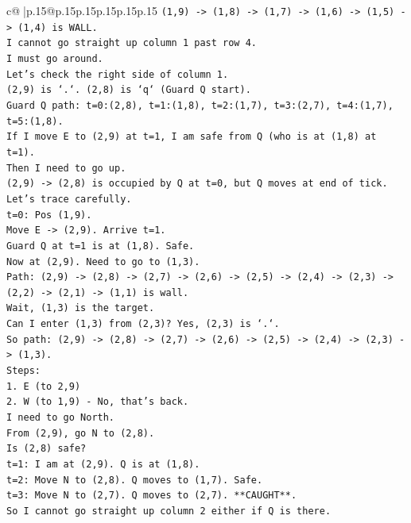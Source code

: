\documentclass{article}
\begin{document}
{\begin{supertabular}{c@{$\;$}|p{.15\linewidth}@{}p{.15\linewidth}p{.15\linewidth}p{.15\linewidth}p{.15\linewidth}p{.15\linewidth}}
{{{\texttt{(1,9) {-}> (1,8) {-}> (1,7) {-}> (1,6) {-}> (1,5) {-}> (1,4) is WALL.} \\
\texttt{I cannot go straight up column 1 past row 4.} \\
\texttt{I must go around.} \\
\texttt{Let's check the right side of column 1.} \\
\texttt{(2,9) is `.`. (2,8) is `q` (Guard Q start).} \\
\texttt{Guard Q path: t=0:(2,8), t=1:(1,8), t=2:(1,7), t=3:(2,7), t=4:(1,7), t=5:(1,8).} \\
\texttt{If I move E to (2,9) at t=1, I am safe from Q (who is at (1,8) at t=1).} \\
\texttt{Then I need to go up.} \\
\texttt{(2,9) {-}> (2,8) is occupied by Q at t=0, but Q moves at end of tick.} \\
\texttt{Let's trace carefully.} \\
\texttt{t=0: Pos (1,9).} \\
\texttt{Move E {-}> (2,9). Arrive t=1.} \\
\texttt{Guard Q at t=1 is at (1,8). Safe.} \\
\texttt{Now at (2,9). Need to go to (1,3).} \\
\texttt{Path: (2,9) {-}> (2,8) {-}> (2,7) {-}> (2,6) {-}> (2,5) {-}> (2,4) {-}> (2,3) {-}> (2,2) {-}> (2,1) {-}> (1,1) is wall.} \\
\texttt{Wait, (1,3) is the target.} \\
\texttt{Can I enter (1,3) from (2,3)? Yes, (2,3) is `.`.} \\
\texttt{So path: (2,9) {-}> (2,8) {-}> (2,7) {-}> (2,6) {-}> (2,5) {-}> (2,4) {-}> (2,3) {-}> (1,3).} \\
\texttt{Steps:} \\
\texttt{1. E (to 2,9)} \\
\texttt{2. W (to 1,9) {-} No, that's back.} \\
\texttt{I need to go North.} \\
\texttt{From (2,9), go N to (2,8).} \\
\texttt{Is (2,8) safe?} \\
\texttt{t=1: I am at (2,9). Q is at (1,8).} \\
\texttt{t=2: Move N to (2,8). Q moves to (1,7). Safe.} \\
\texttt{t=3: Move N to (2,7). Q moves to (2,7). **CAUGHT**.} \\
\texttt{So I cannot go straight up column 2 either if Q is there.} \\
}}}
\end{supertabular}}
\end{document}
